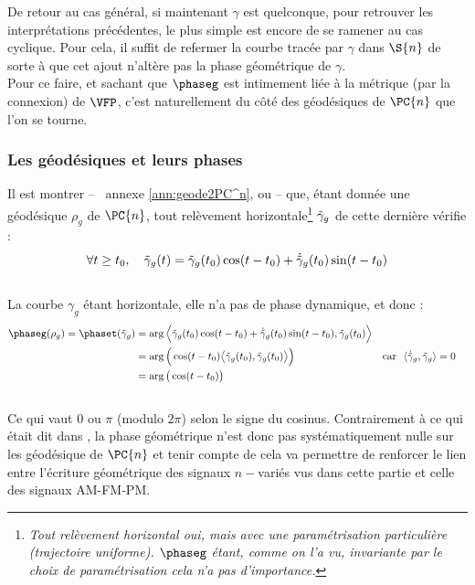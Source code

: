 De retour au cas général, si maintenant $\gamma$ est quelconque, pour retrouver les interprétations précédentes, le plus simple est encore de se ramener au cas cyclique.
Pour cela, il suffit de refermer la courbe tracée par $\gamma$ dans $\S{n}$ de sorte à que cet ajout n'altère pas la phase géométrique de $\gamma$.
\\

Pour ce faire, et sachant que $\phaseg$ est intimement liée à la métrique (par la connexion) de $\VFP$, c'est naturellement du côté des géodésiques de $\PC{n}$ que l'on se tourne.
\\


\subsubsection{Les géodésiques et leurs phases} \label{subsec:phase_g2geode}

Il est montrer -- \cf~annexe \ref{ann:geode2PC^n}, ou \cite[sec.~3.E]{besse_manifolds_1978} -- que, étant donnée une géodésique $\rho_g$ de $\PC{n}$, tout relèvement horizontale\footnote{\itshape
Tout relèvement horizontal oui, mais avec une paramétrisation particulière (trajectoire uniforme).  $\phaseg$ étant, comme on l'a vu, invariante par le choix de paramétrisation cela n'a pas d'importance.}
$\Tilde{\gamma}_g$ de cette dernière vérifie :
\begin{equation}\label{eq:2geodesique}
\forall t\geq t_0,\quad \Tilde{\gamma}_g(t) = \Tilde{\gamma}_g(t_0) \cos (t - t_0) + \dot{\Tilde{\gamma}}_g(t_0) \sin (t - t_0)
\end{equation}
\\
La courbe $\gamma_g$ étant horizontale, elle n'a pas de phase dynamique, et donc :
\begin{equation} \label{eq:phase_g2geode}
\begin{aligned}
	\phaseg(\rho_g) = \phaset(\Tilde{\gamma}_g) 
	&= \arg\Big\langle \Tilde{\gamma}_g(t_0) \cos (t - t_0) + \dot{\Tilde{\gamma}}_g(t_0) \sin (t - t_0),  \Tilde{\gamma}_g(t_0) \Big\rangle \\
	&= \arg\Big(\cos (t - t_0)\big\langle \Tilde{\gamma}_g(t_0) ,  \Tilde{\gamma}_g(t_0) \big\rangle\Big)   &  \text{car }\ \langle\dot{\Tilde{\gamma}}_g,  \Tilde{\gamma}_g \rangle &= 0\\
	&= \arg\big(\cos (t - t_0)\big)
\end{aligned}
\end{equation}
\\ 
Ce qui vaut $0$ ou $\pi$ (modulo $2\pi$) selon le signe du cosinus. 
Contrairement à ce qui était dit dans \cite{mukunda_quantum_1993}, la phase géométrique n'est donc pas systématiquement nulle sur les géodésique de $\PC{n}$ et tenir compte de cela va permettre de renforcer le lien entre l'écriture géométrique des signaux $n-$variés vus dans cette partie et celle des signaux AM-FM-PM.
\\ 

